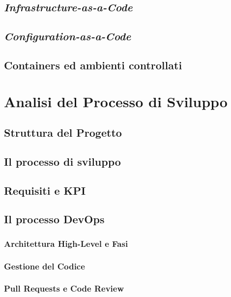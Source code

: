 \documentclass[a4paper,12pt]{report}
\begin{document}
	\section{\emph{Infrastructure-as-a-Code}}
	
	\section{\emph{Configuration-as-a-Code}}
	
	\section{Containers ed ambienti controllati}
	
	\chapter{Analisi del Processo di Sviluppo}
	
	\section{Struttura del Progetto}
	
	\section{Il processo di sviluppo}
	
	\section{Requisiti e KPI}
	
	\section{Il processo DevOps}
	
	\subsection{Architettura High-Level e Fasi}
	
	\subsection{Gestione del Codice}
	
	\subsection{Pull Requests e Code Review}
	
\end{document}
